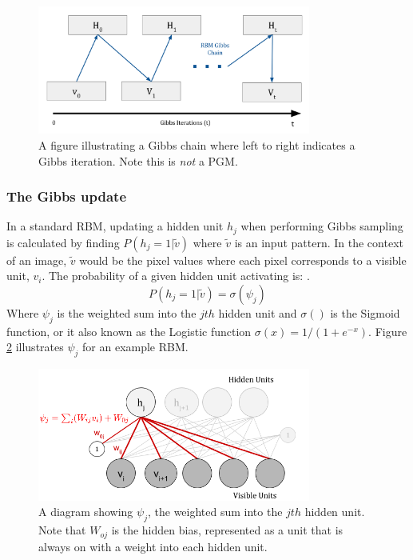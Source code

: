   \begin{figure}[h]
    \begin{center}
      \includegraphics[width=0.8\textwidth]{Assets/RBM-Gibbs-Chain.png}
    \end{center}
    \caption{A figure illustrating a Gibbs chain where left to right indicates a Gibbs iteration. Note this is \emph{not} a PGM.}
    \label{F:Gibbs_Chain}
  \end{figure}

  \subsubsection{The Gibbs update}\label{S:Gibbs-Update}

  In a standard RBM, updating a hidden unit $h_j$ when performing Gibbs sampling is calculated by finding $ P(h_j = 1 | \tilde{v}) $ where $\tilde{v}$ is an input pattern. In the context of an image, $ \tilde{v} $ would be the pixel values where each pixel corresponds to a visible unit, $v_i$.
  The probability of a given hidden unit activating is: .
  \begin{equation}\label{eq:Hid-Gibbs-Update}
  P(h_j = 1 | \tilde{v}) = \sigma(\psi_j)
  \end{equation}
  Where $\psi_j$ is the weighted sum into the $jth$ hidden unit and $\sigma()$ is the Sigmoid function, or it also known as the Logistic function $\sigma(x)=1/(1+e^{-x})$. Figure \ref{F:PSI} illustrates $\psi_j$ for an example RBM.

  \begin{figure}[h]
  \begin{center}
    \includegraphics[width = 0.8\textwidth]{Assets/PSI_and_PHI.png}
  \caption{A diagram showing $\psi_j$, the weighted sum into the $jth$ hidden unit. Note that $W_{oj}$ is the hidden bias, represented as a unit that is always on with a weight into each hidden unit.}
  \label{F:PSI}
  \end{center}
  \end{figure}

